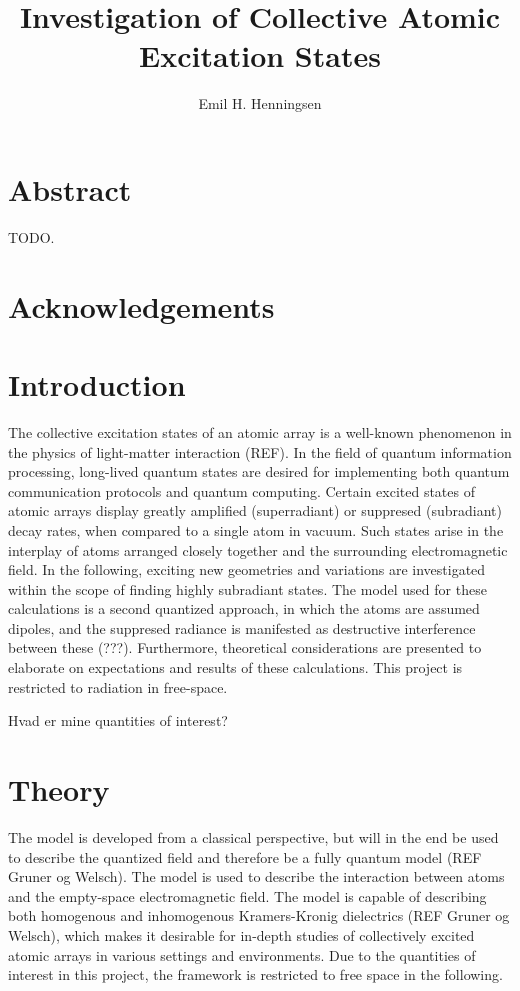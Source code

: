 \documentclass{article}
\author{Emil H. Henningsen}
\title{Investigation of Collective Atomic Excitation States}
\subtitle{}
\institute{Niels Bohr Institute}
\begin{document}
\maketitle

\section*{Abstract}

TODO. 

\section*{Acknowledgements}

\newpage
\tableofcontents

\section{Introduction}

\noindent
The collective excitation states of an atomic array is a well-known phenomenon in the physics of light-matter interaction (REF). In the field of quantum information processing, long-lived quantum states are desired for implementing both quantum communication protocols and quantum computing. Certain excited states of atomic arrays display greatly amplified (superradiant) or suppresed (subradiant) decay rates, when compared to a single atom in vacuum. Such states arise in the interplay of atoms arranged closely together and the surrounding electromagnetic field. In the following, exciting new geometries and variations are investigated within the scope of finding highly subradiant states. The model used for these calculations is a second quantized approach, in which the atoms are assumed dipoles, and the suppresed radiance is manifested as destructive interference between these (???). Furthermore, theoretical considerations are presented to elaborate on expectations and results of these calculations. This project is restricted to radiation in free-space. 

Hvad er mine quantities of interest?

\section{Theory}\label{sec:theory}

\noindent
The model is developed from a classical perspective, but will in the end be used to describe the quantized field and therefore be a fully quantum model (REF Gruner og Welsch). The model is used to describe the interaction between atoms and the empty-space electromagnetic field. The model is capable of describing both homogenous and inhomogenous Kramers-Kronig dielectrics (REF Gruner og Welsch), which makes it desirable for in-depth studies of collectively excited atomic arrays in various settings and environments. Due to the quantities of interest in this project, the framework is restricted to free space in the following. 
\end{document}

